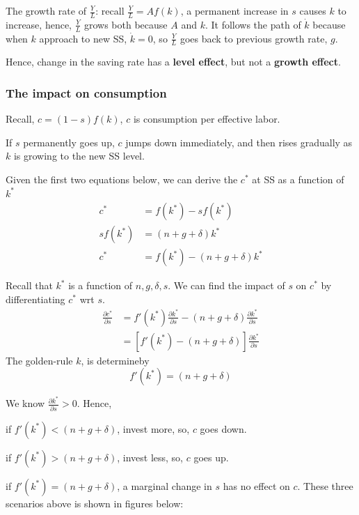 \documentclass[12pt]{article}
\begin{document}
The growth rate of $ \frac{Y}{L} $:
recall $ \frac{Y}{L} = Af(k) $, a permanent increase in $ s $ causes $ k $ to increase,
hence, $ \frac{Y}{L} $ grows both because $ A $ and $ k $. It follows the path
of $ \dot{k} $ because when $ k $ approach to new SS, $ \dot{k} = 0 $, so $ \frac{Y}{L}
$ goes back to previous growth rate, $ g $.

Hence, change in the saving rate has a {\textbf {level effect}}, but not a 
{\textbf {growth effect}}.


\subsubsection{The impact on consumption}

Recall, $ c = (1 - s)f(k) $, $ c $ is consumption per effective labor.

If $ s $ permanently goes up, $ c $ jumps down immediately, and then rises gradually
as $ k $ is growing to the new SS level.

Given the first two equations below, we can derive the $ c^{*} $ at SS as a function
of $ k ^{*} $
\begin{align*}
c^{*} &= f(k ^{*}) - sf(k ^{*})\\
sf(k ^{*}) &= (n + g + \delta)k ^{*}\\
c^{*} &= f(k ^{*}) - (n + g + \delta)k ^{*}
\end{align*}

Recall that $ k ^{*} $ is a function of $ n, g, \delta, s $. We can find the impact
of $ s $ on $ c^{*} $ by differentiating $ c^{*} $ wrt $ s $.
\begin{align*}
\frac{\partial c^{*} }{\partial s }&= f'(k ^{*})\frac{\partial k ^{*} }{\partial s }
 - (n + g + \delta) \frac{\partial k ^{*} }{\partial s }\\
&= [f'(k ^{*}) - (n + g + \delta)]\frac{\partial k ^{*} }{\partial s }
\end{align*}
The golden-rule $ k $, is determineby 
\begin{equation*}
f'(k ^{*}) = (n + g + \delta)
\end{equation*}

We know $ \frac{\partial k ^{*} }{\partial s } > 0 $. Hence,

if  $ f'(k ^{*}) < (n + g + \delta) $, invest more, so, $ c $ goes down.

if  $ f'(k ^{*}) > (n + g + \delta) $, invest less, so, $ c $ goes up.

if  $ f'(k ^{*}) = (n + g + \delta) $, a marginal change in $ s $ has no effect on 
$ c $.
These three scenarios above is shown in figures below:\\
\end{document}
